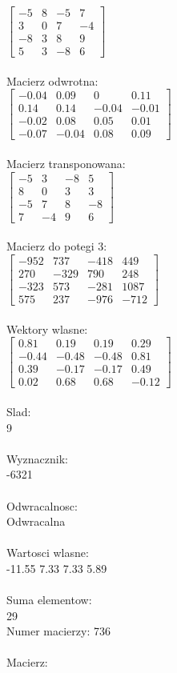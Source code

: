 \documentclass[a4paper,12pt]{article}
\begin{document}
$\begin{bmatrix} -5&8&-5&7\\3&0&7&-4\\-8&3&8&9\\5&3&-8&6 \end{bmatrix}$
\\
\\
Macierz odwrotna:\\

$\begin{bmatrix} -0.04&0.09&0&0.11\\0.14&0.14&-0.04&-0.01\\-0.02&0.08&0.05&0.01\\-0.07&-0.04&0.08&0.09 \end{bmatrix}$
\\
\\
Macierz transponowana:\\

$\begin{bmatrix} -5&3&-8&5\\8&0&3&3\\-5&7&8&-8\\7&-4&9&6 \end{bmatrix}$
\\
\\
Macierz do potegi 3:\\

$\begin{bmatrix} -952&737&-418&449\\270&-329&790&248\\-323&573&-281&1087\\575&237&-976&-712 \end{bmatrix}$
\\
\\
Wektory wlasne:\\

$\begin{bmatrix} 0.81&0.19&0.19&0.29\\-0.44&-0.48&-0.48&0.81\\0.39&-0.17&-0.17&0.49\\0.02&0.68&0.68&-0.12 \end{bmatrix}$
\\
\\
Slad:\\
9
\\
\\
Wyznacznik:\\
-6321
\\
\\
Odwracalnosc:\\
Odwracalna
\\
\\
Wartosci wlasne:\\
-11.55 7.33 7.33 5.89
\\
\\
Suma elementow:\\
29
\\
\newpage
Numer macierzy:
736
\\
\\
Macierz:\\
\end{document}
